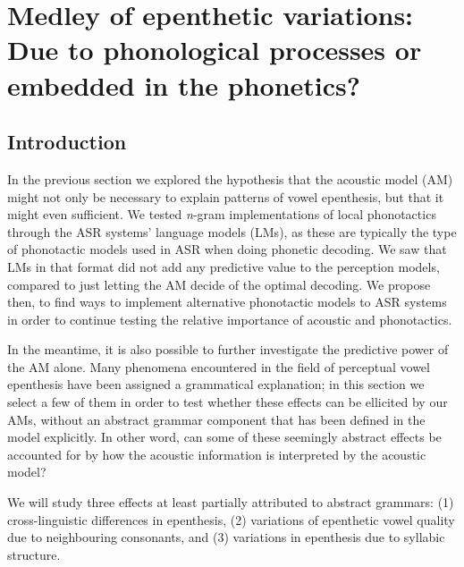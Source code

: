 {%


\newpage
\section{Medley of epenthetic variations: Due to phonological processes or embedded in the phonetics?} \label{3-medley}

\subsection{Introduction}
In the previous section we explored the hypothesis that the acoustic model (AM) might not only be necessary to explain patterns of vowel epenthesis, but that it might even sufficient. We tested \textit{n}-gram implementations of local phonotactics through the ASR systems' language models (LMs), as these are typically the type of phonotactic models used in ASR when doing phonetic decoding. We saw that LMs in that format did not add any predictive value to the perception models, compared to just letting the AM decide of the optimal decoding. We propose then, to find ways to implement alternative phonotactic models to ASR systems in order to continue testing the relative importance of acoustic and phonotactics.

In the meantime, it is also possible to further investigate the predictive power of the AM alone. Many phenomena encountered in the field of perceptual vowel epenthesis have been assigned a grammatical explanation; in this section we select a few of them in order to test whether these effects can be ellicited by our AMs, without an abstract grammar component that has been defined in the model explicitly. In other word, can some of these seemingly abstract effects be accounted for by how the acoustic information is interpreted by the acoustic model?

We will study three effects at least partially attributed to abstract grammars: (1) cross-linguistic differences in epenthesis, (2) variations of epenthetic vowel quality due to neighbouring consonants, and (3) variations in epenthesis due to syllabic structure.

}
